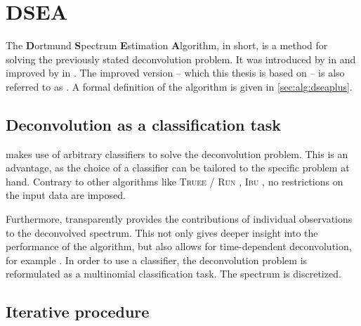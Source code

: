 \section{DSEA} \label{sec:dsea:dsea}
The \textbf{D}ortmund \textbf{S}pectrum \textbf{E}stimation \textbf{A}lgorithm,
  \dsea{} in short, %
is a method for solving the previously stated deconvolution problem.
It was introduced by \citeauthor{dsea_tim} in \citeyear{dsea_tim} \cite{dsea_tim}
and improved by \citeauthor{dsea_mirko} in \citeyear{dsea_mirko} \cite{dsea_mirko}.
The improved version
  – which this thesis is based on –
is also referred to as \dseaplus{}.
%
A formal definition of the \dseaplus{} algorithm is given in \autoref{sec:alg:dseaplus}.


\subsection{Deconvolution as a classification task} %
\dsea{} makes use of arbitrary classifiers to solve the deconvolution problem.
This is an advantage,
  as the choice of a classifier can be tailored to the specific problem at hand.
Contrary to other algorithms like
  \textsc{Truee} / \textsc{Run} \cite{milke2013},
  \textsc{Ibu} \cite{dagostini1995, dagostini2010},
no restrictions on the input data are imposed.

Furthermore,
\dsea{} transparently provides the contributions of individual observations to the deconvolved spectrum.
This not only gives deeper insight into the performance of the algorithm,
but also allows for time-dependent deconvolution,
  for example \cite{dsea_mirko}. %
In order to use a classifier,
  the deconvolution problem is reformulated as a multinomial classification task.
The spectrum is discretized.


\subsection{Iterative procedure}
